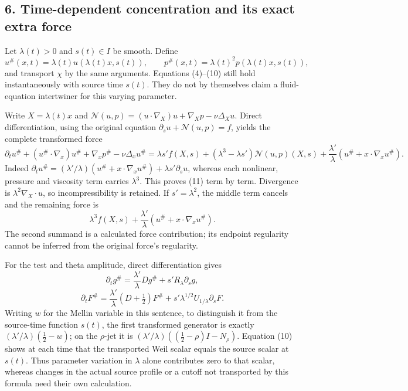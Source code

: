 \subsection{6. Time-dependent concentration and its exact extra
force}\label{time-dependent-concentration-and-its-exact-extra-force}

Let \(\lambda(t)>0\) and \(s(t)\in I\) be smooth. Define \[
u^\#(x,t)=\lambda(t)u(\lambda(t)x,s(t)),\qquad
p^\#(x,t)=\lambda(t)^2p(\lambda(t)x,s(t)),
\] and transport \(\chi\) by the same arguments. Equations (4)--(10)
still hold instantaneously with source time \(s(t)\). They do not by
themselves claim a fluid-equation intertwiner for this varying
parameter.

Write \(X=\lambda(t)x\) and
\(\mathcal N(u,p)= (u\cdot\nabla_X)u+\nabla_Xp-\nu\Delta_Xu\). Direct
differentiation, using the original equation
\(\partial_su+\mathcal N(u,p)=f\), yields the complete transformed force
\[
\boxed{\partial_tu^\#+(u^\#\cdot\nabla_x)u^\#+\nabla_xp^\#-\nu\Delta_xu^\#
=\lambda s'f(X,s)+(\lambda^3-\lambda s')\mathcal N(u,p)(X,s)
+\frac{\lambda'}{\lambda}(u^\#+x\cdot\nabla_xu^\#).}
\tag{11}
\] Indeed
\(\partial_tu^\#=(\lambda'/\lambda)(u^\#+x\cdot\nabla_xu^\#)+\lambda s'\partial_su\),
whereas each nonlinear, pressure and viscosity term carries
\(\lambda^3\). This proves (11) term by term. Divergence is
\(\lambda^2\nabla_X\cdot u\), so incompressibility is retained. If
\(s'=\lambda^2\), the middle term cancels and the remaining force is \[
\lambda^3 f(X,s)+\frac{\lambda'}{\lambda}(u^\#+x\cdot\nabla_xu^\#).
\tag{12}
\] The second summand is a calculated force contribution; its endpoint
regularity cannot be inferred from the original force's regularity.

For the test and theta amplitude, direct differentiation gives \[
\partial_tg^\#=\frac{\lambda'}{\lambda}Dg^\#+s'R_\lambda\partial_sg,
\] \[
\partial_tF^\#=\frac{\lambda'}{\lambda}(D+\tfrac12)F^\#+s'\lambda^{1/2}U_{1/\lambda}\partial_sF.
\tag{13}
\] Writing \(w\) for the Mellin variable in this sentence, to
distinguish it from the source-time function \(s(t)\), the first
transformed generator is exactly \((\lambda'/\lambda)(\tfrac12-w)\); on
the \(\rho\)-jet it is \((\lambda'/\lambda)((\tfrac12-\rho)I-N_\rho)\).
Equation (10) shows at each time that the transported Weil scalar equals
the source scalar at \(s(t)\). Thus parameter variation in \(\lambda\)
alone contributes zero to that scalar, whereas changes in the actual
source profile or a cutoff not transported by this formula need their
own calculation.

